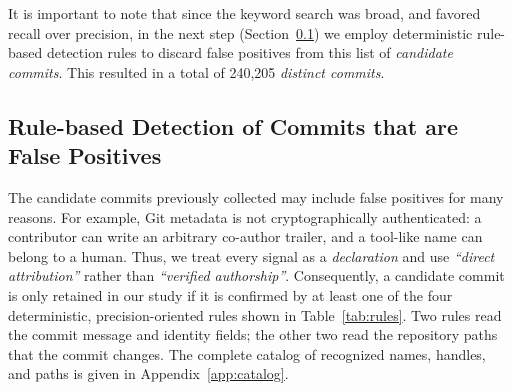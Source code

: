 \documentclass[smallextended,natbib]{svjour3}
\newcommand{\todo}[1]{\textcolor{red}{[TODO: #1]}}
\begin{document}
 It is important to note that since the keyword search was broad, and favored recall over precision, in the next step (Section~\ref{sec:rules}) we  employ deterministic rule-based detection rules to discard false positives from this list of \textit{candidate commits}. This resulted in a total of 240,205 \textit{distinct commits}.

\subsection{Rule-based Detection of Commits that are False Positives}
\label{sec:rules}
\begingroup\sloppy

The candidate commits previously collected may include false positives for many reasons. For example, 
Git metadata is not cryptographically authenticated: a contributor can write an
arbitrary co-author trailer, and a tool-like name can belong to a human.  Thus, we
 treat every signal as a \emph{declaration} and use \textit{``direct
attribution''} rather than \textit{``verified authorship''}. 
Consequently, a
candidate commit is only retained in our study if it is confirmed by at least one of the four deterministic, precision-oriented rules
shown in Table~\ref{tab:rules}.  Two rules read the commit message and identity
fields; the other two read the repository paths that the commit changes.  The
complete catalog of recognized names, handles, and paths is given in
Appendix~\ref{app:catalog}.
\end{document}
